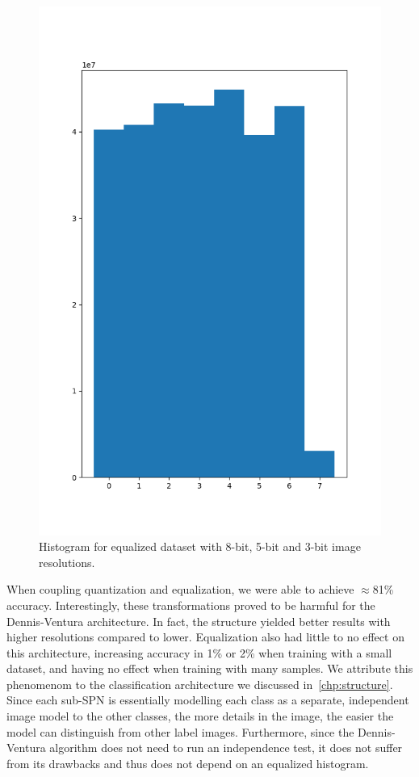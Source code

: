 \begin{figure}[h]
  \includegraphics[scale=0.3]{imgs/hist_3_eq.png}
  \caption{Histogram for equalized dataset with 8-bit, 5-bit and 3-bit image
  resolutions.\label{fig:hist-eq}}
\end{figure}

When coupling quantization and equalization, we were able to achieve $\approx$81\% accuracy.
Interestingly, these transformations proved to be harmful for the Dennis-Ventura architecture. In
fact, the structure yielded better results with higher resolutions compared to lower. Equalization
also had little to no effect on this architecture, increasing accuracy in 1\% or 2\% when training
with a small dataset, and having no effect when training with many samples. We attribute this
phenomenom to the classification architecture we discussed in~\autoref{chp:structure}. Since each
sub-SPN is essentially modelling each class as a separate, independent image model to the other
classes, the more details in the image, the easier the model can distinguish from other label
images.  Furthermore, since the Dennis-Ventura algorithm does not need to run an independence test,
it does not suffer from its drawbacks and thus does not depend on an equalized histogram.

